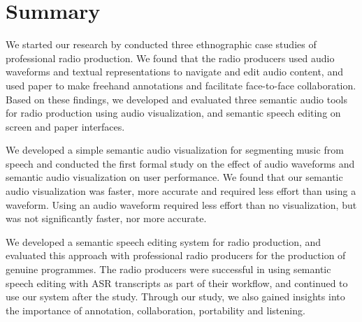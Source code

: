 \clearpage
\section{Summary}\label{sec:conclusions-conclusions}





We started our research by conducted three ethnographic case studies of professional radio production. We found that
the radio producers used audio waveforms and textual representations to navigate and edit audio content, and used paper
to make freehand annotations and facilitate face-to-face collaboration.  Based on these findings, we developed and
evaluated three semantic audio tools for radio production using audio visualization, and semantic speech editing on 
screen and paper interfaces.

We developed a simple semantic audio visualization for segmenting music from speech and conducted the first formal
study on the effect of audio waveforms and semantic audio visualization on user performance. We found that our semantic
audio visualization was faster, more accurate and required less effort than using a waveform.  Using an audio waveform
required less effort than no visualization, but was not significantly faster, nor more accurate.

We developed a semantic speech editing system for radio production, and evaluated this approach with professional radio
producers for the production of genuine programmes. The radio producers were successful in using semantic speech
editing with ASR transcripts as part of their workflow, and continued to use our system after the study. Through our
study, we also gained insights into the importance of annotation, collaboration, portability and listening.

